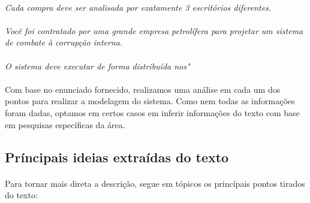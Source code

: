 \documentclass[a4paper,10pt]{article}
\begin{document}
\paragraph{}
\emph{Cada compra deve ser analisada por exatamente 3 escritórios diferentes.}

\paragraph{}
\emph{Você foi contratado por uma grande empresa petrolífera para projetar um
sistema de combate à corrupção interna.}

\paragraph{}
\emph{O sistema deve executar de forma distribuída nos"}

\paragraph{}
Com base no enunciado fornecido, realizamos uma análise em cada um dos pontos
para realizar a modelagem do sistema. Como nem todas as informações foram
dadas, optamos em certos casos em inferir informações do texto com base em
pesquisas específicas da área.

\subsection{Príncipais ideias extraídas do texto}

\paragraph{}
Para tornar mais direta a descrição, segue em tópicos os princípais pontos
tirados do texto:
\end{document}
